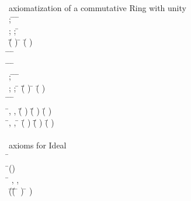 \begin{hetcasl}
\> \\
\> {\small{}\KW{\%\%} axiomatization of a commutative Ring with unity}\\
\> \Ax{\forall}  \Ax{:} ; \= \Ax{:}  \Ax{\bullet} \= \Ax{+}  \Ax{=} \= \Ax{+} \\
\> \Ax{\forall}  \Ax{:} ;  \Ax{:} ; \= \Ax{:}  \\
\> \Ax{\bullet} \=(\= \Ax{+} ) \Ax{+}  \Ax{=} \= \Ax{+} (\= \Ax{+} )\\
\> \Ax{\forall} \= \Ax{:}  \Ax{\bullet} \= \Ax{+}  \Ax{=}  \Ax{\wedge} \= \Ax{+}  \Ax{=} \\
\> \Ax{\forall} \= \Ax{:}  \Ax{\bullet} \=\Ax{\exists}  \Ax{:}  \Ax{\bullet} \= \Ax{+}  \Ax{=} \\
\> \Ax{\forall}  \Ax{:} ; \= \Ax{:}  \Ax{\bullet} \= \Ax{*}  \Ax{=} \= \Ax{*} \\
\> \Ax{\forall}  \Ax{:} ;  \Ax{:} ; \= \Ax{:}  \Ax{\bullet} \=(\= \Ax{*} ) \Ax{*}  \Ax{=} \= \Ax{*} (\= \Ax{*} )\\
\> \Ax{\forall} \= \Ax{:}  \Ax{\bullet} \= \Ax{*}  \Ax{=}  \Ax{\wedge} \= \Ax{*}  \Ax{=} \\
\> \Ax{\forall} \=, ,  \Ax{:}  \Ax{\bullet} \=(\= \Ax{+} ) \Ax{*}  \Ax{=} \=(\= \Ax{*} ) \Ax{+} (\= \Ax{*} )\\
\> \Ax{\forall} \=, ,  \Ax{:}  \Ax{\bullet} \= \Ax{*} (\= \Ax{+} ) \Ax{=} \=(\= \Ax{*} ) \Ax{+} (\= \Ax{*} )\\
\> \\
\> {\small{}\KW{\%\%}axioms for Ideal}\\
\> \Ax{\forall} \= \Ax{:}  \\
\> \Ax{\bullet} \=() \\
\>\> \Ax{\Leftrightarrow} \=\Ax{\forall} , ,  \Ax{:}  \\
\>\>\> \Ax{\bullet} \=(\=(\=   \Ax{\Rightarrow} \=  ) \Ax{\wedge} \=  ) \\

\end{hetcasl}
